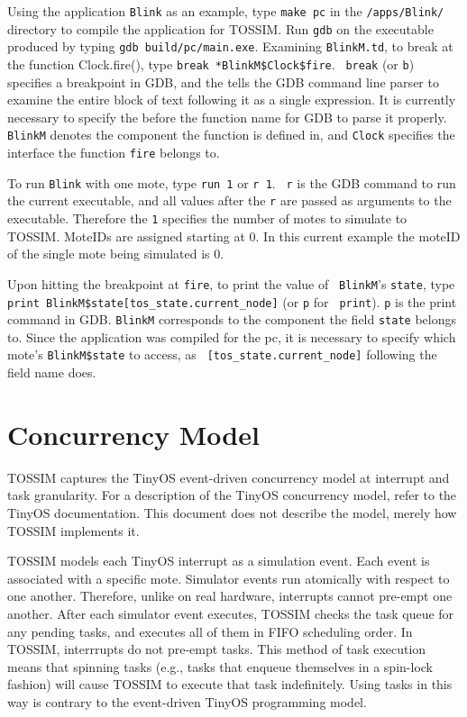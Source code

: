 \documentclass[10pt,fleqn]{article}
\def\sim{TOSSIM\xspace}
\begin{document}
Using the application {\tt Blink} as an example, type {\tt make pc} in
the {\tt /apps/Blink/} directory to compile the application for
\sim. Run {\tt gdb} on the executable produced by typing {\tt gdb
build/pc/main.exe}. Examining {\tt BlinkM.td}, to break at the
function Clock.fire(), type {\tt break *BlinkM\$Clock\$fire}. {\tt
break} (or {\tt b}) specifies a breakpoint in GDB, and the {\tt *}
tells the GDB command line parser to examine the entire block of text
following it as a single expression. It is currently necessary to
specify the {\tt *} before the function name for GDB to parse it
properly. {\tt BlinkM} denotes the component the function is defined
in, and {\tt Clock} specifies the interface the function {\tt fire}
belongs to.

To run {\tt Blink} with one mote, type {\tt run 1} or {\tt r 1}.  {\tt
r} is the GDB command to run the current executable, and all values
after the {\tt r} are passed as arguments to the executable. Therefore
the {\tt 1} specifies the number of motes to simulate to \sim. MoteIDs
are assigned starting at 0.  In this current example the moteID of the
single mote being simulated is 0.

Upon hitting the breakpoint at {\tt fire}, to print the value of {\tt
BlinkM}'s {\tt state}, type \\{\tt print
BlinkM\$state[tos\_state.current\_node]} (or {\tt p} for {\tt
print}). {\tt p} is the print command in GDB. {\tt BlinkM} corresponds
to the component the field {\tt state} belongs to. Since the
application was compiled for the pc, it is necessary to specify which
mote's {\tt BlinkM\$state} to access, as {\tt
[tos\_state.current\_node]} following the field name does.

\section{Concurrency Model}

\sim captures the TinyOS event-driven concurrency model at interrupt and
task granularity. For a description of the TinyOS concurrency model,
refer to the TinyOS documentation. This document does not describe the
model, merely how \sim implements it.

\sim models each TinyOS interrupt as a simulation event. Each event is
associated with a specific mote. Simulator events run atomically with
respect to one another. Therefore, unlike on real hardware, interrupts
cannot pre-empt one another. After each simulator event executes, \sim
checks the task queue for any pending tasks, and executes all of them
in FIFO scheduling order. In \sim, interrrupts do not pre-empt tasks.
This method of task execution means that spinning tasks (e.g., tasks
that enqueue themselves in a spin-lock fashion) will cause \sim to
execute that task indefinitely. Using tasks in this way is contrary to
the event-driven TinyOS programming model.
\end{document}
